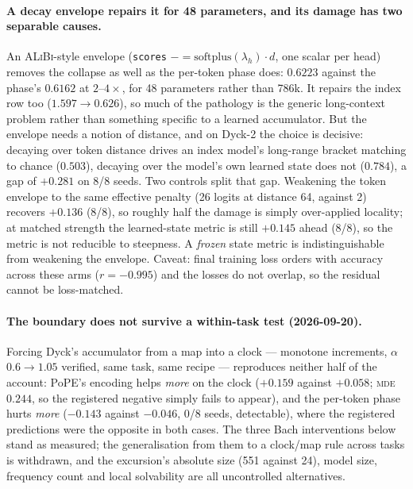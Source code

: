 \documentclass[10pt]{article}
\newcommand{\mde}{\textsc{mde}}
\begin{document}
\paragraph{A decay envelope repairs it for 48 parameters, and its damage has two separable causes.}
An \textsc{ALiBi}-style envelope (\texttt{scores} $-= \mathrm{softplus}(\lambda_h)\cdot d$, one scalar
per head) removes the collapse as well as the per-token phase does: $0.6223$ against the phase's
$0.6162$ at $2$--$4\times$, for 48 parameters rather than 786k. It repairs the index row too
($1.597\to0.626$), so much of the pathology is the generic long-context problem rather than something
specific to a learned accumulator. But the envelope needs a notion of distance, and on Dyck-2 the
choice is decisive: decaying over token distance drives an index model's long-range bracket matching
to chance ($0.503$), decaying over the model's own learned state does not ($0.784$), a gap of $+0.281$
on 8/8 seeds. Two controls split that gap. Weakening the token envelope to the same effective penalty
(26 logits at distance 64, against 2) recovers $+0.136$ (8/8), so roughly half the damage is simply
over-applied locality; at matched strength the learned-state metric is still $+0.145$ ahead (8/8),
so the metric is not reducible to steepness. A \emph{frozen} state metric is indistinguishable from
weakening the envelope. Caveat: final training loss orders with accuracy across these arms
($r=-0.995$) and the losses do not overlap, so the residual cannot be loss-matched.

\paragraph{The boundary does not survive a within-task test (2026-09-20).} Forcing Dyck's
accumulator from a map into a clock --- monotone increments, $\alpha$ $0.6\to1.05$ verified, same
task, same recipe --- reproduces neither half of the account: PoPE's encoding helps \emph{more} on the clock ($+0.159$ against $+0.058$; \mde\ $0.244$, so the
registered negative simply fails to appear), and the per-token phase hurts \emph{more} ($-0.143$ against
$-0.046$, 0/8 seeds, detectable), where the registered predictions were the opposite in both cases.
The three Bach interventions below stand as measured; the generalisation from them to a clock/map
rule across tasks is withdrawn, and the excursion's absolute size (551 against 24), model size,
frequency count and local solvability are all uncontrolled alternatives.
\end{document}
